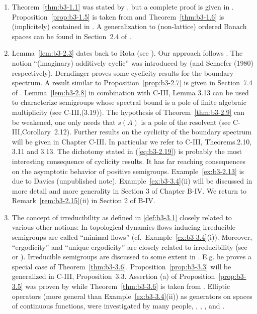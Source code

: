 \begin{enumerate}[label=\emph{Section \arabic*:}, wide]

\item
Theorem~\ref{thm:b3-1.1} was stated by \citet{karlin:1959}, but a complete proof is given in \citet{derndinger:1980}.
Proposition~\ref{prop:b3-1.5}  is taken from \citet{greiner:1982} and Theorem~\ref{thm:b3-1.6} is (implicitely) contained in \citet{derndingernagel:1979}.
A generalization to (non-lattice) ordered Banach spaces can be found in Section~2.4 of \citet{battyrobinson:1984}.

\item
Lemma~\ref{lem:b3-2.3} dates back to Rota (see \citet{schaefer:1974}).
Our approach follows \citet{greiner:1981}.
The notion \enquote{(imaginary) additively cyclic} was introduced by \citet{derndinger:1980} (and {Schaefer (1980)} respectively).
Derndinger proves some cyclicity results for the boundary spectrum.
A result similar to Proposition~\ref{prop:b3-2.7} is given in Section~7.4 of \citet{davies:1980}.
Lemma~\ref{lem:b3-2.8} in combination with C-III, Lemma 3.13 can be used to characterize semigroups whose spectral bound is a pole of finite algebraic multiplicity (see C-III,(3.19)).
The hypothesis of Theorem~\ref{thm:b3-2.9} can be weakened, one only needs that $s(A)$ is a pole of the resolvent (see C-III,Corollary~2.12).
Further results on the cyclicity of the boundary spectrum will be given in Chapter C-III.
In particular we refer to C-III, Theorems.2.10, 3.11 and 3.13.
The dichotomy stated in (\ref{eq:b3-2.19})  is probably the most interesting consequence of cyclicity results.
It has far reaching consequences on the asymptotic behavior of positive semigroups.
Example~\ref{ex:b3-2.13} is due to Davies (unpublished note).
Example~\ref{ex:b3-3.4}(ii) will be discussed in more detail and more generality in Section 3 of Chapter B-IV.
We return to Remark~\ref{rem:b3-2.15}(ii) in Section 2 of B-IV.

\item
The concept of irreducibility as defined in \ref{def:b3-3.1} closely related to various other notions:
In topological dynamics flows inducing irreducible semigroups are called \enquote{minimal flows} (cf.\ Example~\ref{ex:b3-3.4}(i)).
Moreover, \enquote{ergodicity} and \enquote{unique ergodicity} are closely related to irreducibility (see\citet{cornfeldetal:1982} or \citet{krengel:1985}).
Irreducible semigroups are discussed to some extent in \citet{davies:1980}.
E.g. he proves a special case of Theorem~\ref{thm:b3-3.6}.
Proposition~\ref{prop:b3-3.3} will be generalized in C-III, Proposition~3.3.
Assertion (a) of Proposition~\ref{prop:b3-3.5} was proven by \citet{schaefer:1982} while Theorem~\ref{thm:b3-3.6} is taken from \citet{greiner:1982}.
Elliptic operators (more general than Example~\ref{ex:b3-3.4}(ii)) as generators on spaces of continuous functions, were investigated by many people, \eg \citet{bonyetal:1968}, \citet{kuhn:1984}, \citet{roth:1976}, \citet{roth:1978} and \citet{stewart:1974}.


\end{enumerate}
